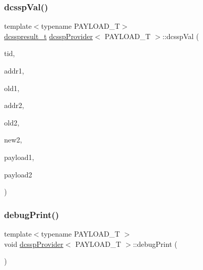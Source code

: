 \mbox{\label{classdcsspProvider_a9585ba7247f125dbdaffbcedeabd0ad6}} 
\subsubsection{\texorpdfstring{dcssp\+Val()}{dcsspVal()}}
{\footnotesize\ttfamily template$<$typename P\+A\+Y\+L\+O\+A\+D\+\_\+T$>$ \\
\hyperlink{structdcsspresult__t}{dcsspresult\+\_\+t} \hyperlink{classdcsspProvider}{dcssp\+Provider}$<$ P\+A\+Y\+L\+O\+A\+D\+\_\+T $>$\+::dcssp\+Val (\begin{DoxyParamCaption}\item[{const int}]{tid,  }\item[{\hyperlink{rq__unsafe_8h_ad45142aaf2ff20a036dc6242b8483e9c}{casword\+\_\+t} $\ast$}]{addr1,  }\item[{\hyperlink{rq__unsafe_8h_ad45142aaf2ff20a036dc6242b8483e9c}{casword\+\_\+t}}]{old1,  }\item[{\hyperlink{rq__unsafe_8h_ad45142aaf2ff20a036dc6242b8483e9c}{casword\+\_\+t} $\ast$}]{addr2,  }\item[{\hyperlink{rq__unsafe_8h_ad45142aaf2ff20a036dc6242b8483e9c}{casword\+\_\+t}}]{old2,  }\item[{\hyperlink{rq__unsafe_8h_ad45142aaf2ff20a036dc6242b8483e9c}{casword\+\_\+t}}]{new2,  }\item[{P\+A\+Y\+L\+O\+A\+D\+\_\+T $\ast$const}]{payload1,  }\item[{P\+A\+Y\+L\+O\+A\+D\+\_\+T $\ast$const}]{payload2 }\end{DoxyParamCaption})\hspace{0.3cm}{\ttfamily [inline]}}

\mbox{\label{classdcsspProvider_a4d51e86af02bf4785da7ffc395d6bce0}} 
\subsubsection{\texorpdfstring{debug\+Print()}{debugPrint()}}
{\footnotesize\ttfamily template$<$typename P\+A\+Y\+L\+O\+A\+D\+\_\+T $>$ \\
void \hyperlink{classdcsspProvider}{dcssp\+Provider}$<$ P\+A\+Y\+L\+O\+A\+D\+\_\+T $>$\+::debug\+Print (\begin{DoxyParamCaption}{ }\end{DoxyParamCaption})}


